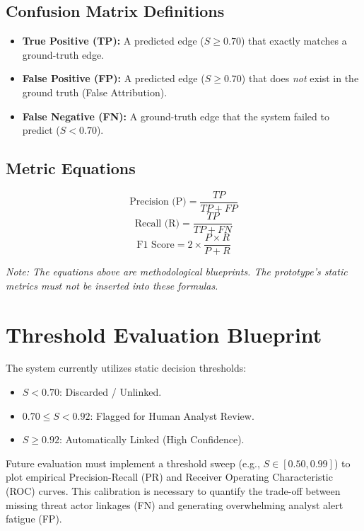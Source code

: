 \subsection{Confusion Matrix Definitions}
\begin{itemize}
    \item \textbf{True Positive (TP):} A predicted edge ($S \ge 0.70$) that exactly matches a ground-truth edge.
    \item \textbf{False Positive (FP):} A predicted edge ($S \ge 0.70$) that does \textit{not} exist in the ground truth (False Attribution).
    \item \textbf{False Negative (FN):} A ground-truth edge that the system failed to predict ($S < 0.70$).
\end{itemize}

\subsection{Metric Equations}
\begin{equation}
    \text{Precision (P)} = \frac{TP}{TP + FP}
\end{equation}
\begin{equation}
    \text{Recall (R)} = \frac{TP}{TP + FN}
\end{equation}
\begin{equation}
    \text{F1 Score} = 2 \times \frac{P \times R}{P + R}
\end{equation}

\textit{Note: The equations above are methodological blueprints. The prototype's static metrics must not be inserted into these formulas.}

\section{Threshold Evaluation Blueprint}
\label{app-sec:eval-threshold}
The system currently utilizes static decision thresholds:
\begin{itemize}
    \item $S < 0.70$: Discarded / Unlinked.
    \item $0.70 \le S < 0.92$: Flagged for Human Analyst Review.
    \item $S \ge 0.92$: Automatically Linked (High Confidence).
\end{itemize}
Future evaluation must implement a threshold sweep (e.g., $S \in [0.50, 0.99]$) to plot empirical Precision-Recall (PR) and Receiver Operating Characteristic (ROC) curves. This calibration is necessary to quantify the trade-off between missing threat actor linkages (FN) and generating overwhelming analyst alert fatigue (FP).


